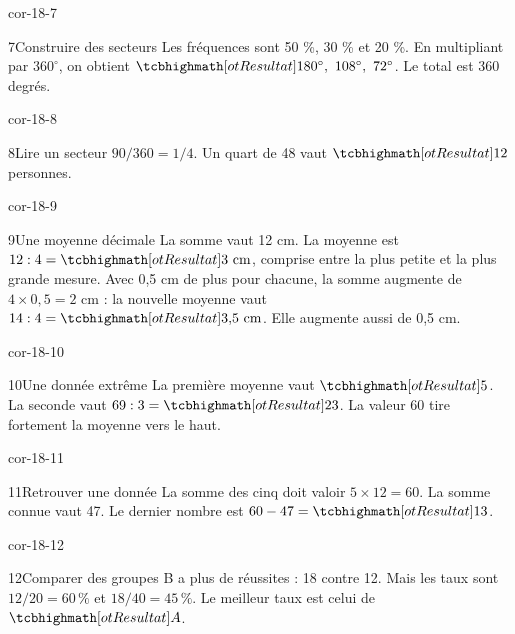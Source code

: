 \begin{blocLivre}{cor-18-7}\begin{corrige}{7}{Construire des secteurs}
Les fréquences sont 50 \%, 30 \% et 20 \%. En multipliant par $360^\circ$, on obtient $\res{180^\circ,\ 108^\circ,\ 72^\circ}$. Le total est 360 degrés.
\label{fig-cor-18-7}
\end{corrige}\end{blocLivre}
\begin{blocLivre}{cor-18-8}\begin{corrige}{8}{Lire un secteur}
$90/360=1/4$. Un quart de 48 vaut $\res{12}$ personnes.
\label{fig-cor-18-8}
\end{corrige}\end{blocLivre}
\begin{blocLivre}{cor-18-9}\begin{corrige}{9}{Une moyenne décimale}
La somme vaut 12 cm. La moyenne est $12:4=\res{3\ \mathrm{cm}}$, comprise entre la plus petite et la plus grande mesure. Avec 0,5 cm de plus pour chacune, la somme augmente de $4\times0{,}5=2$ cm : la nouvelle moyenne vaut $14:4=\res{3{,}5\ \mathrm{cm}}$. Elle augmente aussi de 0,5 cm.
\end{corrige}\end{blocLivre}
\begin{blocLivre}{cor-18-10}\begin{corrige}{10}{Une donnée extrême}
La première moyenne vaut $\res5$. La seconde vaut $69:3=\res{23}$. La valeur 60 tire fortement la moyenne vers le haut.
\end{corrige}\end{blocLivre}
\begin{blocLivre}{cor-18-11}\begin{corrige}{11}{Retrouver une donnée}
La somme des cinq doit valoir $5\times12=60$. La somme connue vaut 47. Le dernier nombre est $60-47=\res{13}$.
\end{corrige}\end{blocLivre}
\begin{blocLivre}{cor-18-12}\begin{corrige}{12}{Comparer des groupes}
B a plus de réussites : 18 contre 12. Mais les taux sont $12/20=60\,\%$ et $18/40=45\,\%$. Le meilleur taux est celui de $\res A$.
\end{corrige}\end{blocLivre}

